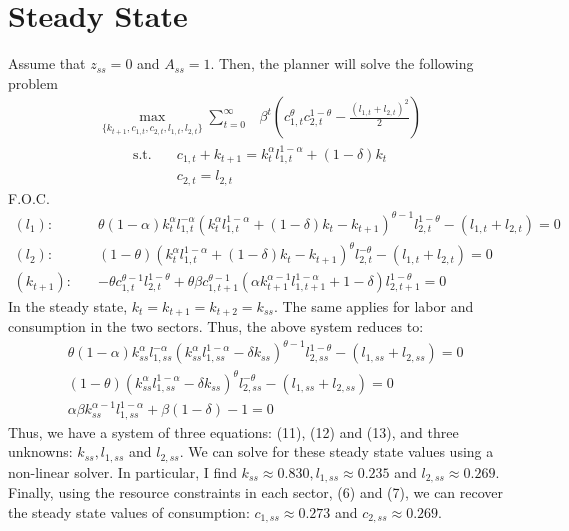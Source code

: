 \documentclass[11pt,a4paper]{article}
\begin{document}
\section{Steady State}
Assume that $z_{ss} = 0 $ and $ A_{ss} = 1 $. Then, the planner will solve the following problem
\begin{align*}
\underset{ \{k_{t+1}, c_{1,t}, c_{2,t}, l_{1,t}, l_{2,t}\} }{\operatorname{max}}  \sum_{t=0}^{\infty} &\beta^{t}\left(c_{1, t}^{\theta} c_{2, t}^{1-\theta}-\frac{(l_{1,t} + l_{2,t})^{2}}{2}\right) 
\end{align*}
\vspace{-1.2cm}\begin{align}
\text{s.t.} \quad &
c_{1, t}+ k_{t+1}= k_{t}^{\alpha} l_{1, t}^{1-\alpha}  + (1-\delta) k_{t} \\
& c_{2, t} =  l_{2,t} 
\end{align}
F.O.C.
\begin{align}
(l_1): \quad  & \theta(1-\alpha) k_t^{\alpha} l_{1,t}^{-\alpha} \left(k_{t}^{\alpha}l_{1,t}^{1-\alpha} + (1-\delta) k_{t}- k_{t+1}\right)^{\theta-1}l_{2,t}^{1-\theta} - \left(l_{1,t} + l_{2,t}\right) = 0
\\
(l_2): \quad & (1-\theta)\left(k_{t}^{\alpha}l_{1,t}^{1-\alpha} + (1 - \delta) k_{t} - k_{t+1}\right)^{\theta}l_{2,t}^{-\theta} - \left(l_{1,t} + l_{2,t}\right) = 0 \\
(k_{t+1}): \quad &- \theta c_{1,t}^{\theta-1} l_{2,t}^{1-\theta} + \theta \beta c_{1,t+1}^{\theta-1} \left(\alpha k_{t+1}^{\alpha-1}l_{1,t+1}^{1-\alpha} + 1 - \delta \right)l_{2,t+1}^{1-\theta} = 0
\end{align}
In the steady state, $k_{t} = k_{t+1}=k_{t+2}=k_{ss}$. The same applies for labor and consumption in the two sectors. Thus, the above system reduces to:
\begin{align}
&\theta(1-\alpha) k_{ss}^{\alpha} l_{1,ss}^{-\alpha} \left(k_{ss}^{\alpha}l_{1,ss}^{1-\alpha}  - \delta k_{ss} \right)^{\theta-1}l_{2,ss}^{1-\theta} - \left(l_{1,ss} + l_{2,ss}\right) = 0
\\
&(1-\theta)\left(k_{ss}^{\alpha}l_{1,ss}^{1-\alpha}  - \delta k_{ss} \right)^{\theta}l_{2,ss}^{-\theta} - \left(l_{1,ss} + l_{2,ss}\right) = 0 \\
& \alpha\beta k_{ss}^{\alpha-1} l_{1,ss}^{1-\alpha} + \beta (1-\delta) - 1 = 0
\end{align}
Thus, we have a system of three equations: (11), (12) and (13), and three unknowns: $k_{ss}, l_{1,ss}$ and $l_{2,ss}$. We can solve for these steady state values using a non-linear solver. In particular, I find $k_{ss} \approx 0.830, l_{1,ss} \approx 0.235$ and $l_{2,ss} \approx 0.269$. 
\\
Finally, using the resource constraints in each sector, (6) and (7), we can recover the steady state values of consumption: $c_{1,ss} \approx 0.273$ and $c_{2,ss} \approx 0.269$. 
\end{document}
